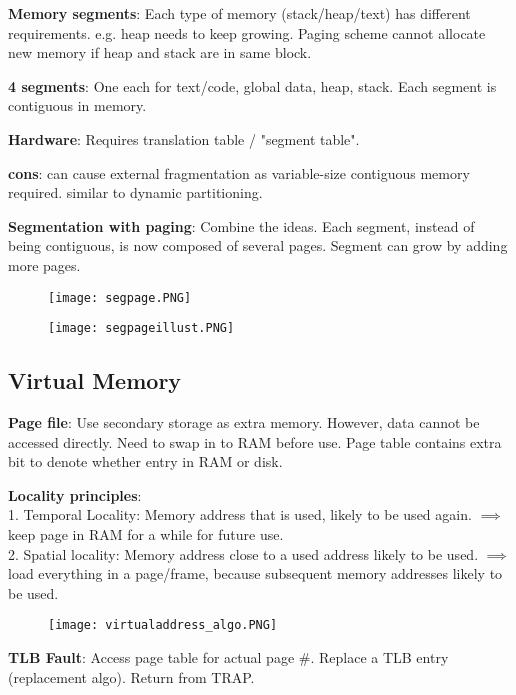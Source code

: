 \documentclass[a4paper,landscape]{article}
\newcommand{\rnsubtopic}[1]{\vspace{-1.5em}\subsection*{#1}\vspace{-1.0em}}
\newcommand{\rnname}[1]{\textbf{#1}}
\begin{document}
\begin{multicols*}{4}
\begin{flatitemize}
\item \rnname{Memory segments}: Each type of memory (stack/heap/text) has different requirements. e.g. heap needs to keep growing. Paging scheme cannot allocate new memory if heap and stack are in same block.
\item \rnname{4 segments}: One each for text/code, global data, heap, stack. Each segment is contiguous in memory.
\item \rnname{Hardware}: Requires translation table / "segment table".
\item \rnname{cons}: can cause external fragmentation as variable-size contiguous memory required. similar to dynamic partitioning.
\item \rnname{Segmentation with paging}: Combine the ideas. Each segment, instead of being contiguous, is now composed of several pages. Segment can grow by adding more pages.
\vspace{-1.5em}
\begin{figure}[H]
  \texttt{[image: segpage.PNG]}
\end{figure}
\vspace{-1.5em}
\vspace{-1.5em}
\begin{figure}[H]
  \texttt{[image: segpageillust.PNG]}
\end{figure}
\vspace{-1.5em}
\rnsubtopic{Virtual Memory}
\item \rnname{Page file}: Use secondary storage as extra memory. However, data cannot be accessed directly. Need to swap in to RAM before use. Page table contains extra bit to denote whether entry in RAM or disk.
\item \rnname{Locality principles}: \\
1. Temporal Locality: Memory address that is used, likely to be used again. $\implies$ keep page in RAM for a while for future use. \\
2. Spatial locality: Memory address close to a used address likely to be used. $\implies$ load everything in a page/frame, because subsequent memory addresses likely to be used.
\vspace{-1.5em}
\begin{figure}[H]
  \texttt{[image: virtualaddress\_algo.PNG]}
\end{figure}
\vspace{-1.5em}
\item \rnname{TLB Fault}: Access page table for actual page #. Replace a TLB entry (replacement algo). Return from TRAP.

\end{flatitemize}
\end{multicols*}
\end{document}
